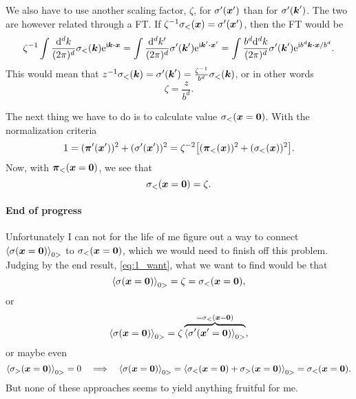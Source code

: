 \documentclass[11pt,letter, swedish, english
]{article}
\begin{document}
We also have to use another scaling factor, $\zeta$, for
$\sigma'(\vb*x')$ than for $\sigma'(\vb*k')$. The two are however
related through a FT. If $\zeta^{-1}\sigma_<(\vb*x) =
\sigma'(\vb*x')$, then the FT would be
\begin{equation}
\zeta^{-1}
\int\frac{\rd^dk}{(2\pi)^d}\sigma_<(\vb*k)\ee^{\ii\vb*k\vdot\vb*x}
=\int\frac{\rd^dk'}{(2\pi)^d}
\sigma'(\vb*k')\ee^{\ii\vb*k'\vdot\vb*x'}
=\int\frac{b^d\rd^dk}{(2\pi)^d}
\sigma'(\vb*k')\ee^{\ii b^d\vb*k\vdot\vb*x/b^d}.
\end{equation}
This would mean that
$ z^{-1}\sigma_<(\vb*k) = \sigma'(\vb*k') 
= \frac{\zeta^{-1}}{b^d}\sigma_<(\vb*k)$, 
or in other words
\begin{equation}
\zeta = \frac{z}{b^d}.
\end{equation}

The next thing we have to do is to calculate value
$\sigma_<(\vb*x=\vb*0)$. With the normalization criteria  
\begin{equation}
1 = (\vb*\pi'(\vb*x'))^2 +(\sigma'(\vb*x'))^2
= \zeta^{-2}\qty[ (\vb*\pi_<(\vb*x))^2 +(\sigma_<(\vb*x))^2].
\end{equation}
Now, with $\vb*\pi_<(\vb*x=\vb*0)$, we see that
\begin{equation}
\sigma_<(\vb*x=\vb*0) = \zeta.
\end{equation}

\paragraph{End of progress}
Unfortunately I can not for the life of me figure out a way to connect
$\ev{\sigma(\vb*x=\vb*0)}_{0>}$ to $\sigma_<(\vb*x=\vb*0)$, which we
would need to finish off this problem. Judging by the end result,
\eqref{eq:1_want}, what we want to find would be that
\begin{equation}
\ev{\sigma(\vb*x=\vb*0)}_{0>} = \zeta 
= \sigma_<(\vb*x=\vb*0),
\end{equation}
or
\begin{equation}
\ev{\sigma(\vb*x=\vb*0)}_{0>} = \zeta
\overbrace{\ev{\sigma'(\vb*x'=\vb*0)}_{0>}}^{=\sigma_<(\vb*x=\vb*0)},
\end{equation}
or maybe even
\begin{equation}
\ev{\sigma_>(\vb*x=\vb*0)}_{0>} =0
\quad\Longrightarrow\quad
\ev{\sigma(\vb*x=\vb*0)}_{0>} 
= \ev{\sigma_<(\vb*x=\vb*0) + \sigma_>(\vb*x=\vb*0) }_{0>}
=\sigma_<(\vb*x=\vb*0).
\end{equation}
But none of these approaches seems to yield anything fruitful for me. 
\end{document}
